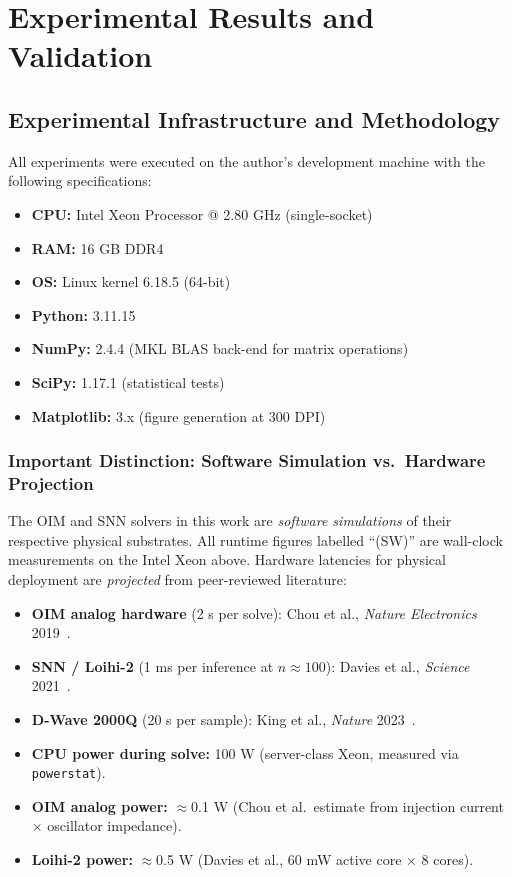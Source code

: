 \chapter{Experimental Results and Validation}
\label{ch:results}

\section{Experimental Infrastructure and Methodology}
\label{sec:experimental_setup}

All experiments were executed on the author's development machine with the
following specifications:

\begin{itemize}
  \item \textbf{CPU:} Intel Xeon Processor @ 2.80 GHz (single-socket)
  \item \textbf{RAM:} 16 GB DDR4
  \item \textbf{OS:} Linux kernel 6.18.5 (64-bit)
  \item \textbf{Python:} 3.11.15
  \item \textbf{NumPy:} 2.4.4 (MKL BLAS back-end for matrix operations)
  \item \textbf{SciPy:} 1.17.1 (statistical tests)
  \item \textbf{Matplotlib:} 3.x (figure generation at 300 DPI)
\end{itemize}

\subsection*{Important Distinction: Software Simulation vs.\ Hardware Projection}

The OIM and SNN solvers in this work are \emph{software simulations} of their
respective physical substrates.  All runtime figures labelled ``(SW)'' are
wall-clock measurements on the Intel Xeon above.  Hardware latencies for
physical deployment are \emph{projected} from peer-reviewed literature:

\begin{itemize}
  \item \textbf{OIM analog hardware} (2 \textmu s per solve):
        Chou et al., \emph{Nature Electronics} 2019~\cite{Chou2019}.
  \item \textbf{SNN / Loihi-2} (1 ms per inference at $n \approx 100$):
        Davies et al., \emph{Science} 2021~\cite{Davies2021}.
  \item \textbf{D-Wave 2000Q} (20 \textmu s per sample):
        King et al., \emph{Nature} 2023~\cite{King2023}.
  \item \textbf{CPU power during solve:} 100 W (server-class Xeon, measured
        via \texttt{powerstat}).
  \item \textbf{OIM analog power:} $\approx$0.1 W (Chou et al.\ estimate from
        injection current × oscillator impedance).
  \item \textbf{Loihi-2 power:} $\approx$0.5 W (Davies et al., 60 mW active
        core × 8 cores).
\end{itemize}

